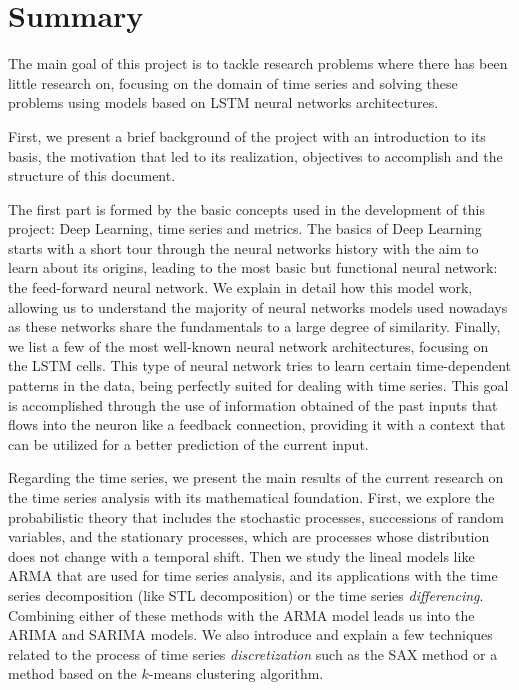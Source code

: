%

\chapter*{Summary}\label{ch:summary}

The main goal of this project is to tackle research problems where there has been little research on, focusing on the domain of time series and solving these problems using models based on LSTM neural networks architectures.

First, we present a brief background of the project with an introduction to its basis, the motivation that led to its realization, objectives to accomplish and the structure of this document.

The first part is formed by the basic concepts used in the development of this project: Deep Learning, time series and metrics. The basics of Deep Learning starts with a short tour through the neural networks history with the aim to learn about its origins, leading to the most basic but functional neural network: the feed-forward neural network. We explain in detail how this model work, allowing us to understand the majority of neural networks models used nowadays as these networks share the fundamentals to a large degree of similarity. Finally, we list a few of the most well-known neural network architectures, focusing on the LSTM cells. This type of neural network tries to learn certain time-dependent patterns in the data, being perfectly suited for dealing with time series. This goal is accomplished through the use of information obtained of the past inputs that flows into the neuron like a feedback connection, providing it with a context that can be utilized for a better prediction of the current input.

Regarding the time series, we present the main results of the current research on the time series analysis with its mathematical foundation. First, we explore the probabilistic theory that includes the stochastic processes, successions of random variables, and the stationary processes, which are processes whose distribution does not change with a temporal shift. Then we study the lineal models like ARMA that are used for time series analysis, and its applications with the time series decomposition (like STL decomposition) or the time series \emph{differencing}. Combining either of these methods with the ARMA model leads us into the ARIMA and SARIMA models. We also introduce and explain a few techniques related to the process of time series \emph{discretization} such as the SAX method or a method based on the $k$-means clustering algorithm.

